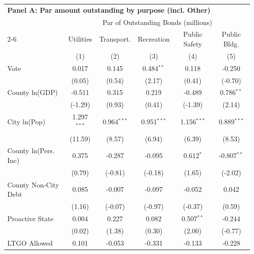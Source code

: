 \begingroup
\centering
\begin{tabular*}{\textwidth}{@{\extracolsep{\fill}}lccccc}
\multicolumn{6}{l}{\textbf{Panel A: Par amount outstanding by purpose (incl. Other)}}\\
\addlinespace
   \toprule
    & \multicolumn{5}{c}{Par of Outstanding Bonds (millions)}\\
   \cmidrule(lr){2-6}
                               & Utilities     & Transport.     & Recreation    & Public Safety  & Public Bldg. \\
                               & (1)           & (2)            & (3)           & (4)            & (5)\\
   \midrule
   Vote                        & 0.017         & 0.145          & 0.484$^{**}$  & 0.118          & -0.250\\
                               & (0.05)       & (0.54)        & (2.17)       & (0.41)        & (-0.70)\\
   County ln(GDP)              & -0.511        & 0.315          & 0.219         & -0.489         & 0.786$^{**}$\\
                               & (-1.29)      & (0.93)        & (0.41)       & (-1.39)       & (2.14)\\
   City ln(Pop)                & 1.297$^{***}$ & 0.964$^{***}$  & 0.951$^{***}$ & 1.156$^{***}$  & 0.889$^{***}$\\
                               & (11.59)      & (8.57)        & (6.94)       & (6.39)        & (8.53)\\
   County ln(Pers. Inc)        & 0.375         & -0.287         & -0.095        & 0.612$^{*}$    & -0.807$^{**}$\\
                               & (0.79)       & (-0.81)       & (-0.18)      & (1.65)        & (-2.02)\\
   County Non-City Debt        & 0.085         & -0.007         & -0.097        & -0.052         & 0.042\\
                               & (1.16)       & (-0.07)       & (-0.97)      & (-0.37)       & (0.59)\\
   Proactive State             & 0.004         & 0.227          & 0.082         & 0.507$^{**}$   & -0.244\\
                               & (0.02)       & (1.38)        & (0.30)       & (2.00)        & (-0.77)\\
   LTGO Allowed                & 0.101         & -0.053         & -0.331        & -0.133         & -0.228\\

\end{tabular*}

